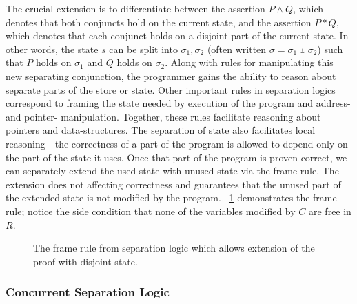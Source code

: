 The crucial extension is to differentiate between the assertion \(P \land Q\),
which denotes that both conjuncts hold on the current state, and the assertion
\(P * Q\), which denotes that each conjunct holds on a disjoint part of the
current state. In other words, the state \(s\) can be split into \(\sigma_1,
\sigma_2\) (often written \(\sigma = \sigma_1 \uplus \sigma_2\)) such that \(P\)
holds on \(\sigma_1\) and \(Q\) holds on \(\sigma_2\). Along with rules for
manipulating this new separating conjunction, the programmer gains the ability
to reason about separate parts of the store or state. Other important rules in
separation logics correspond to framing the state needed by execution of the
program and address- and pointer- manipulation. Together, these rules facilitate
reasoning about pointers and data-structures. The separation of state also
facilitates local reasoning---the correctness of a part of the program is
allowed to depend only on the part of the state it uses. Once that part of the
program is proven correct, we can separately extend the used state with unused
state via the frame rule. The extension does not affecting correctness and
guarantees that the unused part of the extended state is not modified by the
program. \figurename~\ref{F:frame} demonstrates the frame rule; notice the side
condition that none of the variables modified by \(C\) are free in \(R\).

\begin{figure}[ht]
    \centering
    \caption{The frame rule from separation logic which allows extension of the
    proof with disjoint state.}\label{F:frame}
\end{figure}

\subsubsection{Concurrent Separation Logic}

